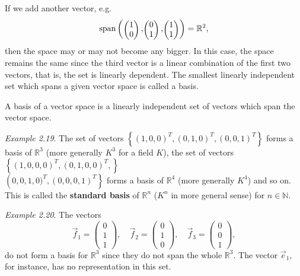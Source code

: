\documentclass[
  letterpaper,
  DIV=11,
  numbers=noendperiod]{scrartcl}
\theoremstyle{remark}
\newenvironment{fbxSimple}[3]{\begin{tcolorbox}[enhanced, breakable,%
attach boxed title to top*={xshift=1.4pt},
boxed title style={boxrule=0.0mm, fuzzy shadow={1pt}{-1pt}{0mm}{0.1mm}{gray}, arc=.3em, rounded corners=east, sharp corners=west}, colframe=#1-color2, colbacktitle=#1-color1, colback = white, coltitle=black,  titlerule=0mm, toprule=0pt, bottomrule=.7pt, leftrule=.3em, rightrule=.7pt, outer arc=.3em,  	left=.5em, right=.5em, bottomtitle=1mm, toptitle=1mm,title=\textbf{#2}\hspace{0.5em}{#3}]}
{\end{tcolorbox}}
\begin{document}
If we add another vector, e.g.
\[{\rm span}\left(\scriptscriptstyle \begin{pmatrix}   1\\0  \end{pmatrix} \textstyle,\scriptscriptstyle \begin{pmatrix}   0\\1  \end{pmatrix} \textstyle, \scriptscriptstyle \begin{pmatrix}   1\\1  \end{pmatrix} \textstyle \right) =\mathbb{R}^{2},\]
then the space may or may not become any bigger. In this case, the space
remains the same since the third vector is a linear combination of the
first two vectors, that is, the set is linearly dependent. The smallest
linearly independent set which spans a given vector space is called a
basis.

\label{basis}
\begin{fbxSimple}{Definition}{Definition 6: }{Basis}
\label{basis}
A basis of a vector space is a linearly independent set of vectors which
span the vector space.

\end{fbxSimple}

\emph{Example 2.19}. The set of vectors
\(\left\{(1,0,0)^{T}, (0,1,0)^{T}, (0,0,1)^{T}\right\}\) forms a basis
of \(\mathbb{R}^{3}\) (more generally \(K^{3}\) for a field \(K\)), the
set of vectors \(\left\{(1,0,0,0)^{T}, (0,1,0,0)^{T},\right\}\)\\
\(\left (0,0,1,0)^{T},(0,0,0,1)^{T}\right\}\) forms a basis of
\(\mathbb{R}^{4}\) (more generally \(K^{4}\)) and so on. This is called
the \textbf{standard basis} of \(\mathbb{R}^{n}\) (\(K^{n}\) in more
general sense) for \(n\in\mathbb{N}\).

\emph{Example 2.20}. The vectors
\[\vec{f}_{1} =  \scriptscriptstyle \begin{pmatrix}   0\\ 1 \\ 1   \end{pmatrix} \textstyle, \quad \vec{f}_{2} =  \scriptscriptstyle \begin{pmatrix}   0\\ 1 \\ 0   \end{pmatrix} \textstyle, \quad \vec{f}_{3} =  \scriptscriptstyle \begin{pmatrix}   0\\ 0 \\ 1  \end{pmatrix} \textstyle,\]
do not form a basis for \(\mathbb{R}^{3}\) since they do not span the
whole \(\mathbb{R}^{3}\). The vector \(\vec{e}_{1}\), for instance, has
no representation in this set.
\end{document}
